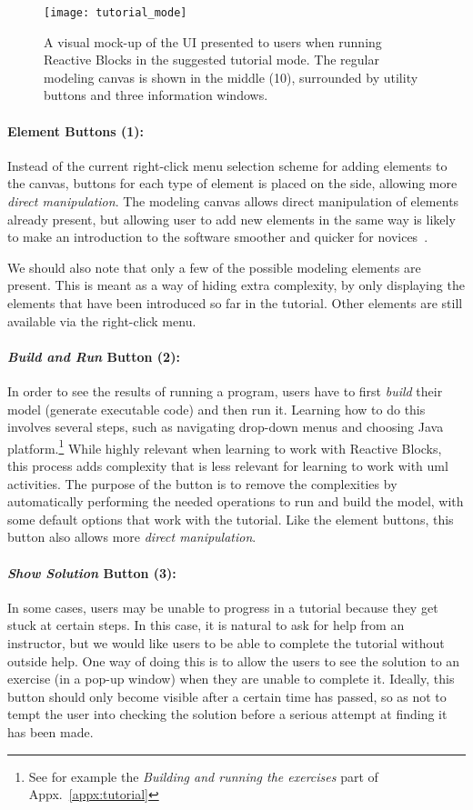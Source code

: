 \begin{figure}[htp]
	\centering
	\texttt{[image: tutorial\_mode]}
	\caption[Reactive Blocks tutorial mode design]{A visual mock-up of the UI presented to users when running Reactive Blocks in the suggested tutorial mode. The regular modeling canvas is shown in the middle (10), surrounded by utility buttons and three information windows.}
	\label{fig:tutorial_mode}
\end{figure}

\paragraph{Element Buttons (1):} Instead of the current right-click menu selection scheme for adding elements to the canvas, buttons for each type of element is placed on the side, allowing more \emph{direct manipulation}. The modeling canvas allows direct manipulation of elements already present, but allowing user to add new elements in the same way is likely to make an introduction to the software smoother and quicker for novices~\cite{shneiderman:user_interface}.

\noindent
We should also note that only a few of the possible modeling elements are present. This is meant as a way of hiding extra complexity, by only displaying the elements that have been introduced so far in the tutorial. Other elements are still available via the right-click menu.

\paragraph{\emph{Build and Run} Button (2):} In order to see the results of running a program, users have to first \emph{build} their model (generate executable code) and then run it. Learning how to do this involves several steps, such as navigating drop-down menus and choosing Java platform.\footnote{See for example the \emph{Building and running the exercises} part of Appx.~\ref{appx:tutorial}} While highly relevant when learning to work with Reactive Blocks, this process adds complexity that is less relevant for learning to work with \gls{uml} activities. The purpose of the button is to remove the complexities by automatically performing the needed operations to run and build the model, with some default options that work with the tutorial. Like the element buttons, this button also allows more \emph{direct manipulation}.

\paragraph{\emph{Show Solution} Button (3):} In some cases, users may be unable to progress in a tutorial because they get stuck at certain steps. In this case, it is natural to ask for help from an instructor, but we would like users to be able to complete the tutorial without outside help. One way of doing this is to allow the users to see the solution to an exercise (in a pop-up window) when they are unable to complete it. Ideally, this button should only become visible after a certain time has passed, so as not to tempt the user into checking the solution before a serious attempt at finding it has been made.

